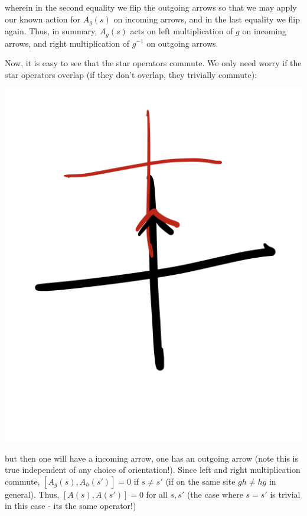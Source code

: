\begin{enumerate}
    wherein in the second equality we flip the outgoing arrows so that we may apply our known action for $A_g(s)$ on incoming arrows, and in the last equality we flip again. Thus, in summary, $A_g(s)$ acts on left multiplication of $g$ on incoming arrows, and right multiplication of $g^{-1}$ on outgoing arrows.

    Now, it is easy to see that the star operators commute. We only need worry if the star operators overlap (if they don't overlap, they trivially commute):

    \begin{center}
        \includegraphics[scale=0.35]{Lectures/Images/lec7-staroverlap.png}
    \end{center}

    but then one will have a incoming arrow, one has an outgoing arrow (note this is true independent of any choice of orientation!). Since left and right multiplication commute, $[A_g(s), A_h(s')] = 0$ if $s \neq s'$ (if on the same site $gh \neq hg$ in general). Thus, $[A(s), A(s')] = 0$ for all $s, s'$ (the case where $s = s'$ is trivial in this case - its the same operator!)


\end{enumerate}
